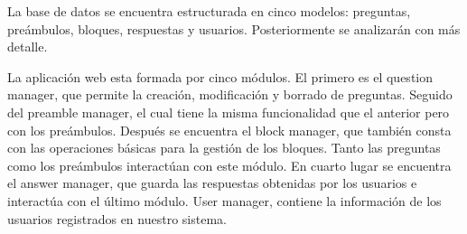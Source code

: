 La base de datos se encuentra estructurada en cinco modelos: preguntas, preámbulos, bloques, respuestas y usuarios. Posteriormente se analizarán con más detalle.

La aplicación web esta formada por cinco módulos. El primero es el question manager, que permite la creación, modificación y borrado de preguntas. Seguido del preamble manager, el cual tiene la misma funcionalidad que el anterior pero con los preámbulos. Después se encuentra el block manager, que también consta con las operaciones básicas para la gestión de los bloques. Tanto las preguntas como los preámbulos interactúan con este módulo. En cuarto lugar se encuentra el answer manager, que guarda las respuestas obtenidas por los usuarios e interactúa con el último módulo. User manager, contiene la información de los usuarios registrados en nuestro sistema.

